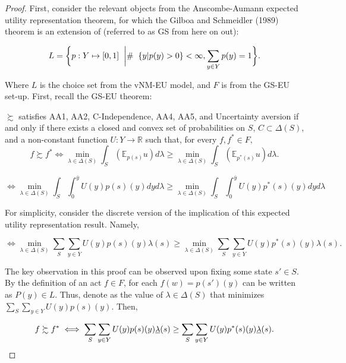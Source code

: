 \documentclass[\econtexRoot/Preproposal]{subfiles}
\begin{document}
\begin{proof}

	\par First, consider the relevant objects from the Anscombe-Aumann expected utility representation theorem, for which the Gilboa and Schmeidler (1989) theorem is an extension of (referred to as GS from here on out):
	
	$$ L = \bigg\{ p: Y \mapsto [0,1] \hspace{2mm} \bigg| \# \hspace{2mm} \{y|p(y)>0\} < \infty, \sum_{y \in Y} p(y) =1  \bigg\}. $$


	\par Where $L$ is the choice set from the vNM-EU model, and $F$ is from the GS-EU set-up. First, recall the GS-EU theorem:

\begin{tm}
$\succsim $ satisfies AA1, AA2, C-Independence, AA4, AA5, and Uncertainty aversion if and only if there exists a closed and convex set of probabilities on $S$, $C \subset \Delta(S)$, and a non-constant function $U: Y \to \mathbb{R}$ such that, for every $f, f^* \in F,$
$$ f \succsim f^* \iff \min_{\lambda \in \Delta(S)} \int_{S} (\mathbb{E}_{p(s)} u) d \lambda  \geq \min_{\lambda \in \Delta(S)} \int_{S} (\mathbb{E}_{p^{*}(s)} u) d \lambda.$$
\end{tm}

$$	\iff  \min_{\lambda \in \Delta(S)} \int_{S} \int_{0}^{\bar{y}} U(y)p(s)(y) dy d \lambda \geq  \min_{\lambda \in \Delta(S)} \int_{S} \int_{0}^{\bar{y}} U(y)p^{*}(s)(y) dy  d \lambda $$

	\par For simplicity, consider the discrete version of the implication of this expected utility representation result. Namely,

$$  \iff  \min_{\lambda \in \Delta(S)} \sum_{S} \sum_{y \in Y} U(y)p(s)(y) \lambda(s) \geq  \min_{\lambda \in \Delta(S)} \sum_{S} \sum_{y \in Y} U(y)p^{*}(s)(y) \lambda(s).   $$

	\par The key observation in this proof can be observed upon fixing some state $s' \in S$. By the definition of an act $f \in F$, for each $f(w)=p(s')(y)$ can be written as $P(y) \in L$. Thus, denote \underbar{$\lambda$} as the value of $\lambda \in \Delta(S)$ that minimizes  $\sum_{S} \sum_{y \in Y} U(y)p(s)(y)$. Then,
	
$$  f \succsim f^* \iff  \sum_{S} \sum_{y \in Y} U(y)p(s)(y) \underbar{$\lambda$}(s) \geq  \sum_{S} \sum_{y \in Y} U(y)p^{*}(s)(y) \underbar{$\lambda$}(s).   $$


\end{proof}
\end{document}
